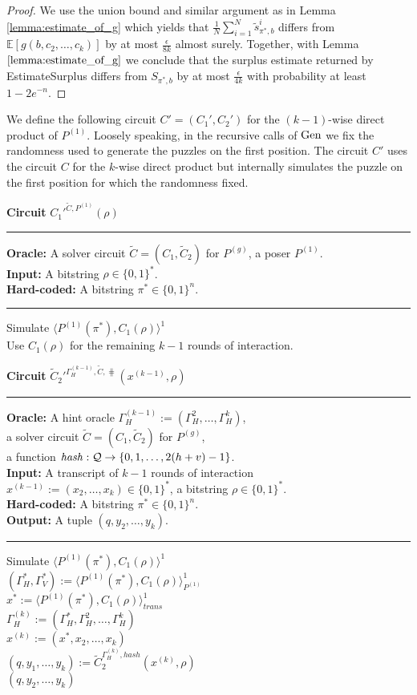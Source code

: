 \begin{proof}
We use the union bound and similar argument as in Lemma \ref{lemma:estimate_of_g}
which yields that $\frac{1}{N} \sum_{i=1}^{N} \widetilde{s}_{\pi^*,b}^i$ differs from
$\mathbb{E}[g(b, c_2, \dots, c_k)]$ by at most $\frac{\epsilon}{8k}$ almost surely. Together, with Lemma $\ref{lemma:estimate_of_g}$ we conclude that the surplus estimate
returned by EstimateSurplus differs from $S_{\pi^*,b}$ by at most $\frac{\epsilon}{4k}$ with probability at least $1 - 2e^{-n}$.
\end{proof}
%
We define the following circuit $C' = (C_1', C_2')$ for the $(k-1)$-wise direct product of $P^{(1)}$.
Loosely speaking, in the recursive calls of $\operatorname{\text{Gen}}$ we fix the randomness used to generate the puzzles on the first position.
The circuit $C'$ uses the circuit $C$ for the $k$-wise direct product but internally simulates the puzzle on the first position
for which the randomness fixed.
\begin{codeblock}
  \textbf{Circuit} $C_1'^{\widetilde{C}, P^{(1)}}(\rho)$
  \medskip \hrule
  \textbf{Oracle:} A solver circuit $\widetilde{C} = (C_1, \widetilde{C}_2)$ for $P^{(g)}$, a poser $P^{(1)}$. \\
  \textbf{Input:}  A bitstring $\rho \in \{0,1\}^{*}$. \\
  \textbf{Hard-coded:} A bitstring $\pi^* \in \{0,1\}^{n}$.
  \medskip\hrule
  Simulate $\langle P^{(1)}(\pi^*), C_1(\rho)\rangle^1$ \\
  Use $C_1(\rho)$ for the remaining $k-1$ rounds of interaction.
\end{codeblock}
%
\begin{codeblock}
  \textbf{Circuit} $\widetilde{C}_2'^{\Gamma_H^{(k-1)}, \widetilde{C}, \hash}(x^{(k-1)}, \rho)$
  \medskip \hrule
  \textbf{Oracle:} A hint oracle $\Gamma_H^{(k-1)} := (\Gamma_H^{2}, \dots, \Gamma_H^{k})$,\\
  \IndII a solver circuit $\widetilde{C} = (C_1, \widetilde{C}_2)$ for $P^{(g)}$, \\
  \IndII a function $\operatorname{\mathit{hash}}: \mathcal{Q} \rightarrow \{0,1,\dots, 2(h+v)-1\}$. \\
  \textbf{Input:}  A transcript of $k-1$ rounds of interaction \\
  \IndII $x^{(k-1)} := (x_2, \dotsc, x_{k}) \in \{0,1\}^{*}$, a bitstring $\rho \in \{0,1\}^{*}$.\\
  \textbf{Hard-coded:} A bitstring $\pi^* \in \{0,1\}^{n}$. \\
  \textbf{Output:} A tuple $(q, y_2, \dots, y_k)$.
  \medskip\hrule
  Simulate $\langle P^{(1)}(\pi^*), C_1(\rho) \rangle^{1}$ \\
  \IndI $(\Gamma_H^*, \Gamma_V^*) := \langle P^{(1)}(\pi^*), C_1(\rho) \rangle^{1}_{P^{(1)}}$ \\
  \IndI $x^* := \langle P^{(1)}(\pi^*), C_1(\rho) \rangle^{1}_{\mathit{trans}}$ \\
  $\Gamma_H^{(k)} := (\Gamma_H^*, \Gamma_H^{2}, \dots, \Gamma_H^{k})$ \\
  $x^{(k)} := (x^*, x_2, \dots, x_{k})$ \\
  $(q, y_1, \dots, y_k) := \widetilde{C}_2^{\Gamma_H^{(k)}, \mathit{hash}}(x^{(k)}, \rho)$ \\
  \Return $(q, y_2, \dots, y_k)$
\end{codeblock}
